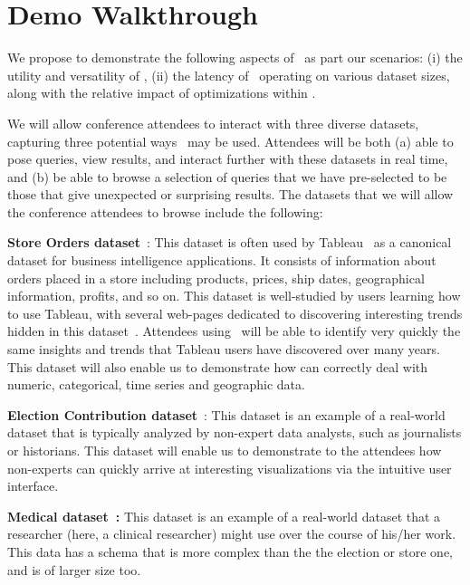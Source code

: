 
\section{Demo Walkthrough}
\label{demo-walkthrough}

We propose to demonstrate the following aspects of \SeeDB\ as part our
scenarios: (i) the utility and versatility of \SeeDB, (ii) the latency
of \SeeDB\ operating on various dataset sizes, along with the relative
impact of optimizations within \SeeDB.

 We will allow
conference attendees to interact with three diverse datasets,
capturing three potential ways \SeeDB\ may be used. Attendees will be
both (a) able to pose queries, view results, and interact further with
these datasets in real time, and (b) be able to browse a selection of
queries that we have pre-selected to be those that give unexpected or
surprising results. The datasets that we will allow the conference
attendees to browse include the following:

\squishlist
  \item {\bf Store Orders dataset}~\cite{superstore}: This dataset is
    often used by Tableau~\cite{tableau} as a canonical dataset for
    business intelligence applications. It consists of information
    about orders placed in a store including products, prices, ship
    dates, geographical information, profits, and so on. This dataset
    is well-studied by users learning how to use Tableau, with several
    web-pages dedicated to discovering interesting trends hidden in
    this dataset~\cite{website}. Attendees using \SeeDB\ will be able
    to identify very quickly the same insights and trends that Tableau
    users have discovered over many years. This dataset will also
    enable us to demonstrate how \SeeDB can correctly deal with
    numeric, categorical, time series and geographic data.
  \item {\bf Election Contribution dataset}~\cite{}: This dataset is
    an example of a real-world dataset that is typically analyzed by
    non-expert data analysts, such as journalists or historians. This
    dataset will enable us to demonstrate to the attendees how
    non-experts can quickly arrive at interesting visualizations via
    the intuitive user interface.
  \item {\bf Medical dataset~\cite{}:} This dataset is an example of a
    real-world dataset that a researcher (here, a clinical researcher)
    might use over the course of his/her work. This data has a schema
    that is more complex than the the election or store one, and is of
    larger size too.  \squishend

